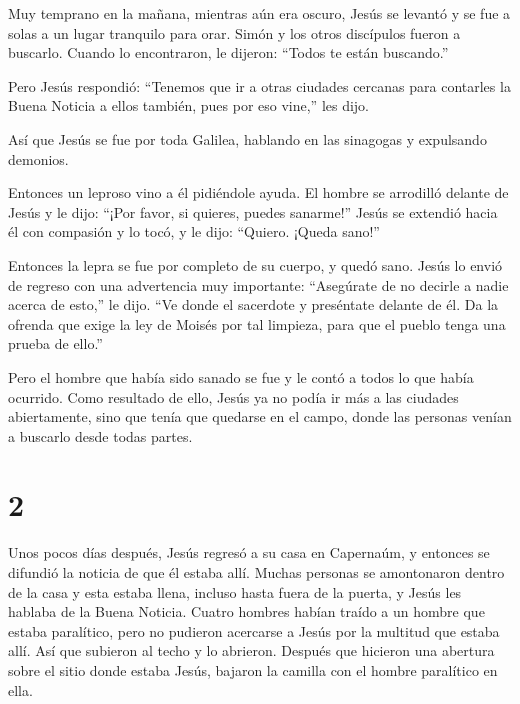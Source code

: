  Muy temprano en la mañana, mientras aún era oscuro, Jesús
se levantó y se fue a solas a un lugar tranquilo para orar.
 Simón y los otros discípulos fueron a buscarlo.
 Cuando lo encontraron, le dijeron: ``Todos te están
buscando.''

 Pero Jesús respondió: ``Tenemos que ir a otras ciudades
cercanas para contarles la Buena Noticia a ellos también, pues por eso
vine,'' les dijo.

 Así que Jesús se fue por toda Galilea, hablando en las
sinagogas y expulsando demonios.

 Entonces un leproso vino a él pidiéndole ayuda. El hombre
se arrodilló delante de Jesús y le dijo: ``¡Por favor, si quieres,
puedes sanarme!''  Jesús se extendió hacia él con compasión
y lo tocó, y le dijo: ``Quiero. ¡Queda sano!''

 Entonces la lepra se fue por completo de su cuerpo, y
quedó sano.  Jesús lo envió de regreso con una advertencia
muy importante:  ``Asegúrate de no decirle a nadie acerca
de esto,'' le dijo. ``Ve donde el sacerdote y preséntate delante de él.
Da la ofrenda que exige la ley de Moisés por tal limpieza, para que el
pueblo tenga una prueba de ello.''

 Pero el hombre que había sido sanado se fue y le contó a
todos lo que había ocurrido. Como resultado de ello, Jesús ya no podía
ir más a las ciudades abiertamente, sino que tenía que quedarse en el
campo, donde las personas venían a buscarlo desde todas partes.

\hypertarget{section-1}{%
\section{2}\label{section-1}}

 Unos pocos días después, Jesús regresó a su casa en
Capernaúm, y entonces se difundió la noticia de que él estaba allí.
 Muchas personas se amontonaron dentro de la casa y esta
estaba llena, incluso hasta fuera de la puerta, y Jesús les hablaba de
la Buena Noticia.  Cuatro hombres habían traído a un hombre
que estaba paralítico,  pero no pudieron acercarse a Jesús
por la multitud que estaba allí. Así que subieron al techo y lo
abrieron. Después que hicieron una abertura sobre el sitio donde estaba
Jesús, bajaron la camilla con el hombre paralítico en ella.

